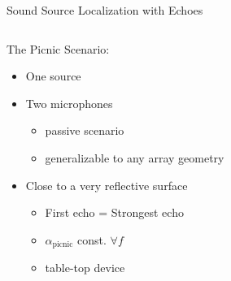 \begin{frame}[t]{Sound Source Localization \alert{with Echoes} \hfill\faMapMarked*}

    \vspace*{2mm}
    \begin{columns}[T,onlytextwidth]

        \begin{column}{0.5\textwidth}
            \begin{block}{The \alert{Picnic} Scenario:}
                \begin{itemize}
                    \small
                    \item<1-> One source
                    \item<1-> Two microphones
                    \begin{itemize}
                        \item<1->[$\rightarrow$] passive scenario
                        \item<1->[$\rightarrow$] generalizable to any array geometry
                    \end{itemize}
                    \item<2-> Close to a very reflective surface
                    \begin{itemize}
                        \item<2->[$\rightarrow$] First echo = Strongest echo
                        \item<2->[$\rightarrow$] $\alpha_\text{picnic}$ const. $\forall f$
                        \item<2->[$\rightarrow$] table-top device
                    \end{itemize}
                \end{itemize}
            \end{block}
        \end{column}


\end{columns}
\end{frame}
